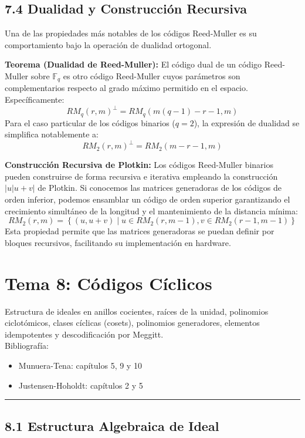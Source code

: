 \documentclass{article}
\newcommand{\hlinecolor}{\noindent\textcolor{azuloscuro}{\rule{\textwidth}{1pt}}}
\begin{document}
\subsection{7.4 Dualidad y Construcción Recursiva}

Una de las propiedades más notables de los códigos Reed-Muller es su comportamiento bajo la operación de dualidad ortogonal. 

\textbf{Teorema (Dualidad de Reed-Muller):}
El código dual de un código Reed-Muller sobre $\mathbb{F}_q$ es otro código Reed-Muller cuyos parámetros son complementarios respecto al grado máximo permitido en el espacio. Específicamente:
\[
RM_q(r, m)^\perp = RM_q(m(q-1) - r - 1, m)
\]
Para el caso particular de los códigos binarios ($q=2$), la expresión de dualidad se simplifica notablemente a:
\[
RM_2(r, m)^\perp = RM_2(m - r - 1, m)
\]

\textbf{Construcción Recursiva de Plotkin:}
Los códigos Reed-Muller binarios pueden construirse de forma recursiva e iterativa empleando la construcción $|u|u+v|$ de Plotkin. Si conocemos las matrices generadoras de los códigos de orden inferior, podemos ensamblar un código de orden superior garantizando el crecimiento simultáneo de la longitud y el mantenimiento de la distancia mínima:
\[
RM_2(r, m) = \left\{ (u, u+v) \mid u \in RM_2(r, m-1), v \in RM_2(r-1, m-1) \right\}
\]
Esta propiedad permite que las matrices generadoras se puedan definir por bloques recursivos, facilitando su implementación en hardware.

\newpage
\section{Tema 8: Códigos Cíclicos}
Estructura de ideales en anillos cocientes, raíces de la unidad, polinomios ciclotómicos, clases cíclicas (cosets), polinomios generadores, elementos idempotentes y descodificación por Meggitt.\\
Bibliografía:
\begin{itemize}
\item Munuera-Tena: capítulos 5, 9 y 10
\item Justensen-Hoholdt: capítulos 2 y 5
\end{itemize}
\hlinecolor{}
\vspace{0.5cm}

\subsection{8.1 Estructura Algebraica de Ideal}
\end{document}
